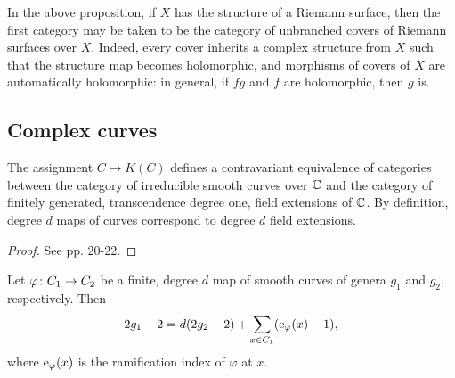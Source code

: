 \begin{rmk}
 In the above proposition, if $X$ has the structure of a Riemann surface, then the first category may be taken to be the category of unbranched covers of Riemann surfaces over $X$. Indeed, every cover inherits a complex structure from $X$ such that the structure map becomes holomorphic, and morphisms of covers of $X$ are automatically holomorphic: in general, if $fg$ and $f$ are holomorphic, then $g$ is.
\end{rmk}


\subsection{Complex curves}

\begin{prop} \label{prop:curves-to-fields}
 The assignment $C\mapsto K(C)$ defines a contravariant equivalence of categories between the category of irreducible smooth curves over $\mathbb{C}$ 
and the 
category of finitely generated, transcendence degree one, field extensions of $\mathbb{C}$. By definition, degree $d$ maps of curves correspond 
to degree $d$ field extensions.
\end{prop}

\begin{proof}
 See \cite{Silverman2009} pp. 20-22.
\end{proof}

\begin{prop} \label{prop:hurwitz}
 Let $\varphi \colon C_1 \to C_2$ be a finite, degree $d$ map of smooth curves of genera $g_1$ and $g_2$, respectively. Then \[2g_1-2 = d(2g_2-2) + 
\sum_{x\in C_1}(\operatorname{e}_{\varphi}(x)-1),\] where $\operatorname{e}_\varphi(x)$ is the ramification index of $\varphi$ at $x$.
\end{prop}

